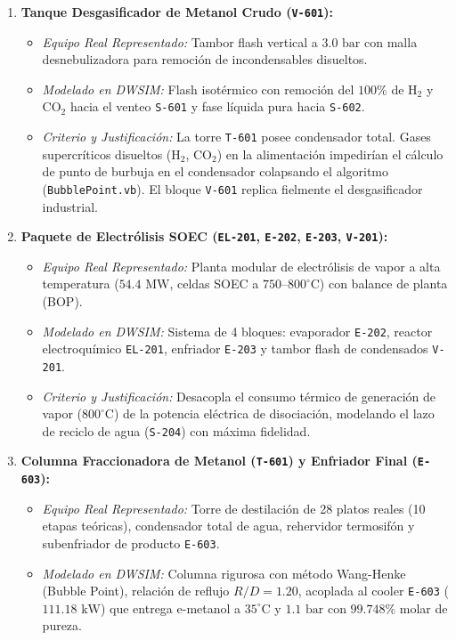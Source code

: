 \documentclass[11pt,letterpaper]{article}
\begin{document}
\begin{enumerate}[leftmargin=1.1em,itemsep=1.0pt,parsep=0pt,topsep=1pt]
    \item \textbf{Tanque Desgasificador de Metanol Crudo (\texttt{V-601}):}
    \begin{itemize}[leftmargin=0.9em,itemsep=0pt,parsep=0pt,topsep=0.5pt]
        \item \textit{Equipo Real Representado:} Tambor flash vertical a $3.0\text{ bar}$ con malla desnebulizadora para remoción de incondensables disueltos.
        \item \textit{Modelado en DWSIM:} Flash isotérmico con remoción del $100\%$ de $\text{H}_2$ y $\text{CO}_2$ hacia el venteo \texttt{S-601} y fase líquida pura hacia \texttt{S-602}.
        \item \textit{Criterio y Justificación:} La torre \texttt{T-601} posee condensador total. Gases supercríticos disueltos ($\text{H}_2$, $\text{CO}_2$) en la alimentación impedirían el cálculo de punto de burbuja en el condensador colapsando el algoritmo (\texttt{BubblePoint.vb}). El bloque \texttt{V-601} replica fielmente el desgasificador industrial.
    \end{itemize}

    \item \textbf{Paquete de Electrólisis SOEC (\texttt{EL-201}, \texttt{E-202}, \texttt{E-203}, \texttt{V-201}):}
    \begin{itemize}[leftmargin=0.9em,itemsep=0pt,parsep=0pt,topsep=0.5pt]
        \item \textit{Equipo Real Representado:} Planta modular de electrólisis de vapor a alta temperatura ($54.4\text{ MW}$, celdas SOEC a $750\text{--}800^\circ\text{C}$) con balance de planta (BOP).
        \item \textit{Modelado en DWSIM:} Sistema de 4 bloques: evaporador \texttt{E-202}, reactor electroquímico \texttt{EL-201}, enfriador \texttt{E-203} y tambor flash de condensados \texttt{V-201}.
        \item \textit{Criterio y Justificación:} Desacopla el consumo térmico de generación de vapor ($800^\circ\text{C}$) de la potencia eléctrica de disociación, modelando el lazo de reciclo de agua (\texttt{S-204}) con máxima fidelidad.
    \end{itemize}

    \item \textbf{Columna Fraccionadora de Metanol (\texttt{T-601}) y Enfriador Final (\texttt{E-603}):}
    \begin{itemize}[leftmargin=0.9em,itemsep=0pt,parsep=0pt,topsep=0.5pt]
        \item \textit{Equipo Real Representado:} Torre de destilación de 28 platos reales (10 etapas teóricas), condensador total de agua, rehervidor termosifón y subenfriador de producto \texttt{E-603}.
        \item \textit{Modelado en DWSIM:} Columna rigurosa con método Wang-Henke (Bubble Point), relación de reflujo $R/D = 1.20$, acoplada al cooler \texttt{E-603} ($111.18\text{ kW}$) que entrega e-metanol a $35^\circ\text{C}$ y $1.1\text{ bar}$ con $99.748\%$ molar de pureza.
    \end{itemize}
\end{enumerate}
\end{document}
